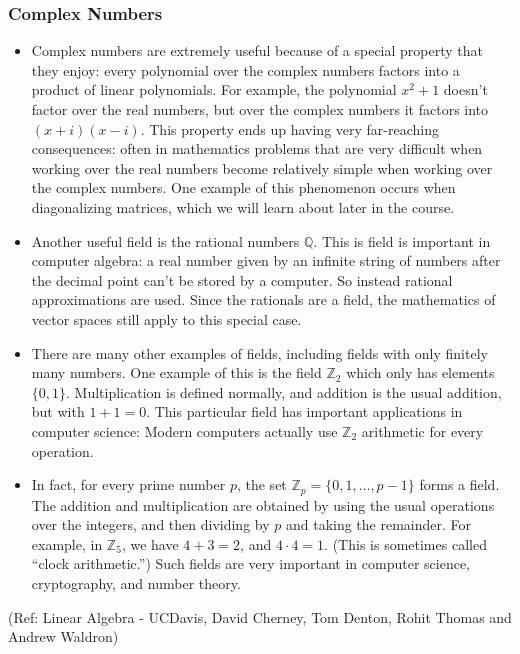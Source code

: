 \begin{frame}[fragile]
\frametitle{Complex Numbers}
\begin{itemize}
\item Complex numbers are extremely useful because of a special property that they enjoy: every polynomial over the complex numbers factors into a product of linear polynomials.  For example, the polynomial $x^2+1$ doesn't factor over the real numbers, but over the complex numbers it factors into $(x+i)(x-i)$.  This property ends up having very far-reaching consequences: often in mathematics problems that are very difficult when working over the real numbers become relatively simple when working over the complex numbers.  One example of this phenomenon occurs when diagonalizing matrices, which we will learn about later in the course.

\item Another useful field is the rational numbers $\mathbb{Q}$.  This is field is important in computer algebra: a real number given by an infinite string of numbers after the decimal point can't be stored by a computer.  So instead rational approximations are used.  Since the rationals are a field, the mathematics of vector spaces still apply to this special case.

\item There are many other examples of fields, including fields with only finitely many numbers.  One example of this is the field $\mathbb{Z}_2$ which only has elements $\{0,1\}$.  Multiplication is defined normally, and addition is the usual addition, but with $1+1=0$.  This particular field has important applications in computer science:  Modern computers actually use $\mathbb{Z}_2$ arithmetic for every operation.  

\item In fact, for every prime number $p$, the set $\mathbb{Z}_p=\{0,1,\ldots, p-1\} $ forms a field.  The addition and multiplication are obtained by using the usual operations over the integers, and then dividing by $p$ and taking the remainder.  For example, in $\mathbb{Z}_5$, we have $4+3=2$, and $4\cdot4=1$.  (This is sometimes called ``clock arithmetic.'')  Such fields are very important in computer science, cryptography, and number theory.

\end{itemize}

\tiny{(Ref: Linear Algebra - UCDavis, David Cherney, Tom Denton, Rohit Thomas and Andrew Waldron)}
\end{frame}


